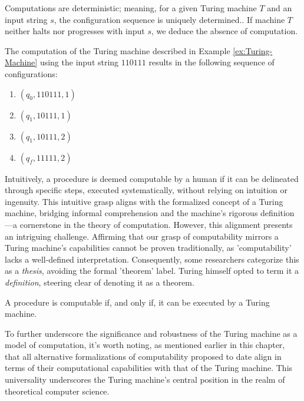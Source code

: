 Computations are deterministic; meaning, for a given Turing machine $T$ and an input string $s$, the configuration sequence is uniquely determined.. If machine $T$ neither halts nor progresses with input $s$, we deduce the absence of computation.

\begin{example}
The computation of the Turing machine described in Example \ref{ex:Turing-Machine} using the input string $110111$ results in the following sequence of configurations:

\begin{enumerate}
\item $(q_0, 110111, 1)$
\item $(q_1, 10111,  1)$
\item $(q_1, 10111,  2)$  
\item $(q_f, 11111,  2)$  
\end{enumerate}

\end{example}

Intuitively, a procedure is deemed computable by a human if it can be delineated through specific steps, executed systematically, without relying on intuition or ingenuity. This intuitive grasp aligns with the formalized concept of a Turing machine, bridging informal comprehension and the machine's rigorous definition—a cornerstone in the theory of computation. However, this alignment presents an intriguing challenge. Affirming that our grasp of computability mirrors a Turing machine's capabilities cannot be proven traditionally, as 'computability' lacks a well-defined interpretation. Consequently, some researchers categorize this as a \emph{thesis}, avoiding the formal 'theorem' label. Turing himself opted to term it a \emph{definition}, steering clear of denoting it as a theorem.

\begin{theorem}
\label{th:turing_thesis}
A procedure is computable if, and only if, it can be executed by a Turing machine.
\end{theorem}

To further underscore the significance and robustness of the Turing machine as a model of computation, it's worth noting, as mentioned earlier in this chapter, that all alternative formalizations of computability proposed to date align in terms of their computational capabilities with that of the Turing machine. This universality underscores the Turing machine's central position in the realm of theoretical computer science.

